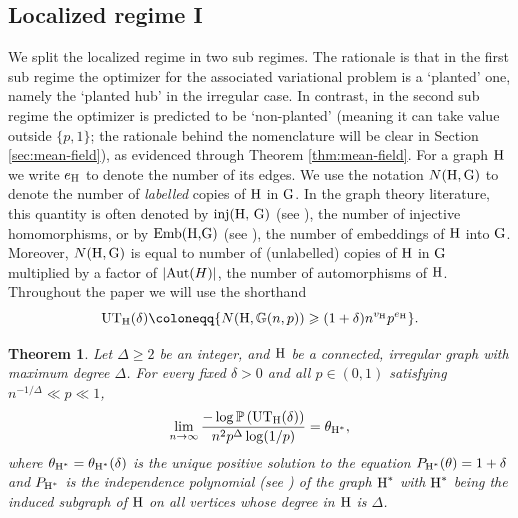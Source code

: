\documentclass[a4paper,11pt,english,reqno]{amsart}
\numberwithin{equation}{section}
\renewcommand{\geq}{\geqslant}
\newcommand{\UTH}{\textup{UT}_{\textup{H}}(\delta)}
\newcommand{\uH}{\textup{H}}
\renewcommand{\P}{\mathbb{P}}
\newcommand{\G}{\mathbb{G}}
\newcommand{\tu}[1]{\textup{#1}}
\newtheorem{theorem}{Theorem}[section]
\newcommand{\purple}[1]{{\color{purple} #1}}
\begin{document}
	\subsection{Localized regime I} We split the localized regime in two sub regimes. The rationale is that in the first sub regime the optimizer for the associated variational problem is a `planted' one, namely the `planted hub' in the irregular case. In contrast, in the second sub regime the optimizer is predicted to be  `non-planted' (meaning it can take value outside $\{p,1\}$; the rationale behind the nomenclature will be clear in Section \ref{sec:mean-field}), as evidenced through Theorem \ref{thm:mean-field}. %
For a graph $\uH$ we write $e_\uH$ to denote the number of its edges.  We use the notation $N(\uH, \tu{G})$ to denote the number of {\em labelled} copies of $\uH$ in $\tu{G}$. In the graph theory literature, this quantity is often denoted by $\tu{inj(H, G)}$ (see \cite{Lovasz}), the number of injective homomorphisms, or by $\tu{Emb(H,G)}$ (see \cite{HMS}), the number of embeddings of $\uH$ into $\tu{G}$.  Moreover, $N(\uH, \tu{G})$ is equal to number of (unlabelled) copies of $\uH$ in $\tu{G}$ multiplied by a factor of $|\tu{Aut}(H)|$, the number of automorphisms of $\uH$.  Throughout the paper we will use the shorthand\\
	\begin{equation*}
		\UTH\coloneqq\{N(\uH, \G(n,p))\geq (1+\delta)n^{v_{\uH}}p^{e_{\uH}}\}.
	\end{equation*}
	
	\begin{theorem}\label{thm:loc-1}
		Let $\Delta\geq 2$ be an integer, and ${\uH}$ be a connected, irregular graph with maximum degree $\Delta$. For every fixed $\delta>0$ and all $p\in(0,1)$ satisfying $n^{-1/\Delta}\ll p\ll1$,
		\begin{equation*}
			\lim_{n\rightarrow \infty} \frac{-\log\P\left(\UTH\right)}{n^{2}p^{\Delta}\log(1/p)} = \theta_{{\uH}^*},
		\end{equation*}
		where $\theta_{{\uH}^{*}} =\theta_{\uH^*}(\delta)$ is the unique positive solution to the equation $P_{{\uH}^{*}}(\theta)=1+\delta$ and $P_{{\uH}^{*}}$ is the independence polynomial (see \cite[Definition 1.1]{BGLZ}) of the graph ${\uH}^{*}$ with ${\uH}^{*}$ being the induced subgraph of ${\uH}$ on all vertices whose degree in $\uH$ is $\Delta$.
	\end{theorem}
	
\end{document}
